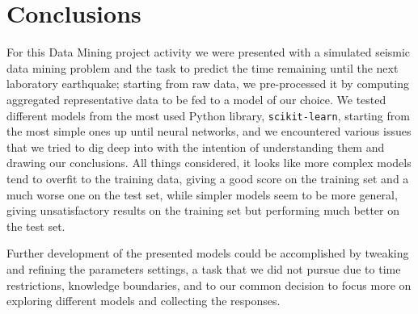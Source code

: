\chapter{Conclusions}
\label{conclusioni}
\thispagestyle{empty}

\noindent For this Data Mining project activity we were presented with a simulated seismic data mining problem and the task to predict the time remaining until the next laboratory earthquake; starting from raw data, we pre-processed it by computing aggregated representative data to be fed to a model of our choice. We tested different models from the most used Python library, \texttt{scikit-learn}, starting from the most simple ones up until neural networks, and we encountered various issues that we tried to dig deep into with the intention of understanding them and drawing our conclusions. All things considered, it looks like more complex models tend to overfit to the training data, giving a good score on the training set and a much worse one on the test set, while simpler models seem to be more general, giving unsatisfactory results on the training set but performing much better on the test set.

Further development of the presented models could be accomplished by tweaking and refining the parameters settings, a task that we did not pursue due to time restrictions, knowledge boundaries, and to our common decision to focus more on exploring different models and collecting the responses.